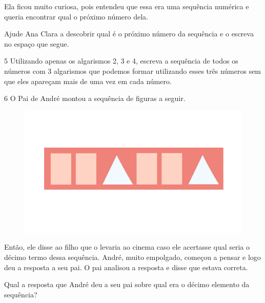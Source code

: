 Ela ficou muito curiosa, pois entendeu que essa era uma sequência
numérica e queria encontrar qual o próximo número dela.

Ajude Ana Clara a descobrir qual é o próximo número da sequência e o escreva no espaço que segue.



\num{5} Utilizando apenas os algarismos 2, 3 e 4, escreva a sequência de
todos os números com 3 algarismos que podemos formar utilizando esses
três números sem que eles apareçam mais de uma vez em cada número.



\num{6} O Pai de André montou a sequência de figuras a seguir.

\begin{figure}[htpb!]
\includegraphics[width=\textwidth]{../ilustracoes/MAT5/SAEB_5ANO_MAT_figura28.png}
\end{figure}

Então, ele disse ao filho que o levaria ao cinema caso ele acertasse
qual seria o décimo termo dessa sequência. André, muito empolgado, começou a
pensar e logo deu a resposta a seu pai. O pai analisou a resposta e
disse que estava correta.

Qual a resposta que André deu a seu pai sobre qual era o décimo elemento da sequência?


